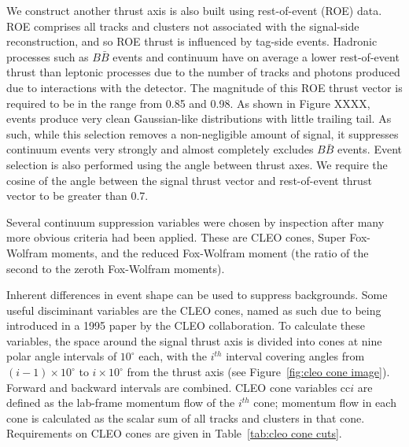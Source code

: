 \documentclass[12pt]{thesis}  %
\begin{document}
We construct another thrust axis is also built using rest-of-event (ROE) data. ROE comprises all tracks and clusters not associated with the signal-side reconstruction, and so ROE thrust is influenced by tag-side events. Hadronic processes such as $B\bar{B}$ events and continuum have on average a lower rest-of-event thrust than leptonic processes due to the number of tracks and photons produced due to interactions with the detector. The magnitude of this ROE thrust vector is required to be in the range from \num{0.85} and \num{0.98}. As shown in Figure XXXX, events produce very clean Gaussian-like distributions with little trailing tail. As such, while this selection removes a non-negligible amount of signal, it suppresses continuum events very strongly and almost completely excludes $B\bar{B}$ events. Event selection is also performed using the angle between thrust axes. We require the cosine of the angle between the signal thrust vector and rest-of-event thrust vector to be greater than \num{0.7}.


Several continuum suppression variables were chosen by inspection after many more obvious criteria had been applied. These are CLEO cones, Super Fox-Wolfram moments, and the reduced Fox-Wolfram moment (the ratio of the second to the zeroth Fox-Wolfram moments).

Inherent differences in event shape can be used to suppress backgrounds. Some useful disciminant variables are the CLEO cones, named as such due to being introduced in a 1995 paper by the CLEO collaboration\cite{cleo-cones}. To calculate these variables, the space around the signal thrust axis is divided into cones at nine polar angle intervals of $10^{\circ}$ each, with the $i^{th}$ interval covering angles from $(i-1)\times 10^{\circ}$ to $i\times 10^{\circ}$ from the thrust axis (see Figure~\ref{fig:cleo cone image}). Forward and backward intervals are combined. CLEO cone variables cc$i$ are defined as the lab-frame momentum flow of the $i^{th}$ cone; momentum flow in each cone is calculated as the scalar sum of all tracks and clusters in that cone. Requirements on CLEO cones are given in Table~\ref{tab:cleo cone cuts}.
\end{document}
